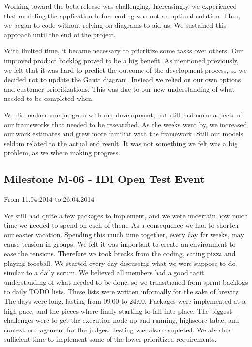 Working toward the beta release was challenging. Increasingly, we
experienced that modeling the application before coding was not an
optimal solution. Thus, we began to code without relying on diagrams to
aid us. We sustained this approach until the end of the project.

With limited time, it became necessary to prioritize some tasks over
others. Our improved product backlog proved to be a
big benefit. As mentioned previously, we felt that it was hard to
predict the outcome of the development process, so we decided not to
update the Gantt diagram. Instead we relied on our own options and
customer prioritizations. This was due to our new understanding of what
needed to be completed when.

We did make some progress with our development, but still had some
aspects of our frameworks that needed to be researched. As the weeks went
by, we increased our work estimates and grew more familiar with the
framework. Still our models seldom related to the actual end result. It
was not something we felt was a big problem, as we where making progress. \ 

\subsection{Milestone M-06 - IDI Open Test Event}
\label{sec:M06}
From 11.04.2014 to 26.04.2014

We still had quite a few packages to implement, and we were uncertain
how much time we needed to spend on each of them. As a consequence
we had to shorten our easter vacation. Spending this much time together,
every day for weeks, may cause tension in groups. We felt it was
important to create an environment to ease the tensions. Therefore we
took breaks from the coding, eating pizza and playing foosball. We started every day discussing what we were suppose to do, similar to a
daily scrum. We believed all members had a good tacit understanding of
what needed to be done, so we transitioned from sprint backlogs to
daily TODO lists. These lists were written informally for the sake of
brevity.\newline
\newline
The days were long, lasting from 09:00 to 24:00. Packages were
implemented at a high pace, and the pieces where finaly starting to fall into place. 
The biggest challenges were to get the execution node up and
running, highscore table, and contest management for the judges. Testing
was also completed. We also had sufficient time to implement some of
the lower prioritized requirements. 

